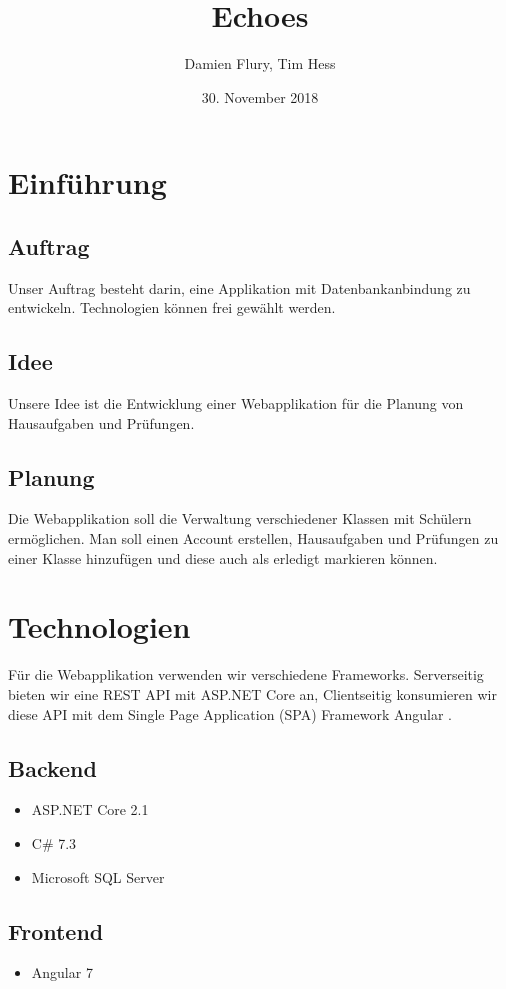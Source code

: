 \documentclass[a4paper, titlepage]{article}
\title{Echoes}
\author{Damien Flury, Tim Hess}
\date{30. November 2018}
\begin{document}
    \maketitle
    \tableofcontents
    \newpage

    \section{Einführung}
    \subsection{Auftrag}
    Unser Auftrag besteht darin, eine Applikation mit Datenbankanbindung zu entwickeln. Technologien
    können frei gewählt werden.
    \subsection{Idee}
    Unsere Idee ist die Entwicklung einer Webapplikation für die Planung von Hausaufgaben
    und Prüfungen. 
    \subsection{Planung}
    Die Webapplikation soll die Verwaltung verschiedener Klassen mit Schülern ermöglichen.
    Man soll einen Account erstellen, Hausaufgaben und Prüfungen zu einer Klasse hinzufügen
    und diese auch als erledigt markieren können.
    \section{Technologien}
    Für die Webapplikation verwenden wir verschiedene Frameworks. Serverseitig bieten wir
    eine REST API mit ASP.NET Core \cite{Dotnet} an, Clientseitig konsumieren wir diese API mit dem Single
    Page Application (SPA) Framework Angular \cite{Angular}.
    \subsection{Backend}
    \begin{itemize}
        \item ASP.NET Core 2.1
        \item C\# 7.3
        \item Microsoft SQL Server
    \end{itemize}
    \subsection{Frontend}
    \begin{itemize}
    \item Angular 7
    \end{itemize}

    \newpage
    \printbibliography
\end{document}

